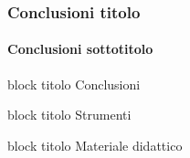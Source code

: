 




\begin{frame}
	\frametitle{Conclusioni titolo}
	\framesubtitle{Conclusioni sottotitolo}
	\addtocounter{nframe}{1}

	\begin{block}{block titolo}
		Conclusioni
	\end{block}

	\begin{block}{block titolo}
		Strumenti
	\end{block}

	\begin{block}{block titolo}
		Materiale didattico
	\end{block}

\end{frame}